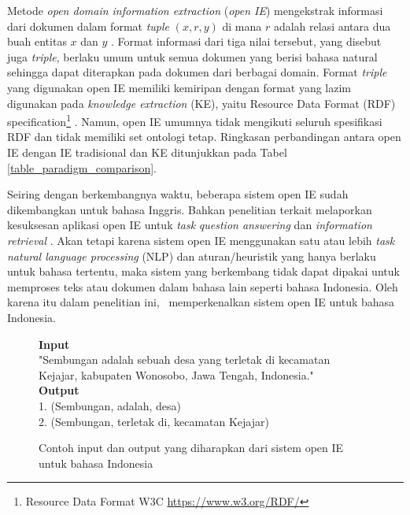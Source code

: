 Metode \textit{open domain information extraction} (\textit{open IE}) mengekstrak informasi dari dokumen dalam format \textit{tuple} $(x, r, y)$ di mana $r$ adalah relasi antara dua buah entitas $x$ dan $y$ \citep{etzioni2011open}. Format informasi dari tiga nilai tersebut, yang disebut juga \textit{triple}, berlaku umum untuk semua dokumen yang berisi bahasa natural sehingga dapat diterapkan pada dokumen dari berbagai domain. Format \textit{triple} yang digunakan open IE memiliki kemiripan dengan format yang lazim digunakan pada \textit{knowledge extraction} (KE), yaitu Resource Data Format (RDF) specification\footnote{Resource Data Format W3C \url{https://www.w3.org/RDF/}} \citep{auer2007dbpedia, exner2014refractive}. Namun, open IE umumnya tidak mengikuti seluruh spesifikasi RDF dan tidak memiliki set ontologi tetap. Ringkasan perbandingan antara open IE dengan IE tradisional dan KE ditunjukkan pada Tabel \ref{table_paradigm_comparison}. 

Seiring dengan berkembangnya waktu, beberapa sistem open IE sudah dikembangkan \citep{schmitz2012open} untuk bahasa Inggris. Bahkan penelitian terkait melaporkan kesuksesan aplikasi open IE untuk \textit{task} \textit{question answering} \citep{fader2011identifying} dan \textit{information retrieval} \citep{etzioni2011search}. Akan tetapi karena sistem open IE menggunakan satu atau lebih \textit{task natural language processing} (NLP) dan aturan/heuristik yang hanya berlaku untuk bahasa tertentu, maka sistem yang berkembang tidak dapat dipakai untuk memproses teks atau dokumen dalam bahasa lain seperti bahasa Indonesia. Oleh karena itu dalam penelitian ini, \saya~memperkenalkan sistem open IE untuk bahasa Indonesia.

\begin{figure}
	\begin{mdframed}
		\textbf{Input} \\
		"Sembungan adalah sebuah desa yang terletak di kecamatan Kejajar, kabupaten Wonosobo, Jawa Tengah, Indonesia." \\
		
		\textbf{Output} \\
		1. (Sembungan, adalah, desa) \\
		2. (Sembungan, terletak di, kecamatan Kejajar)
	\end{mdframed}
	\caption{Contoh input dan output yang diharapkan dari sistem open IE untuk bahasa Indonesia}
	\label{fig_example_io_openie}
\end{figure}

